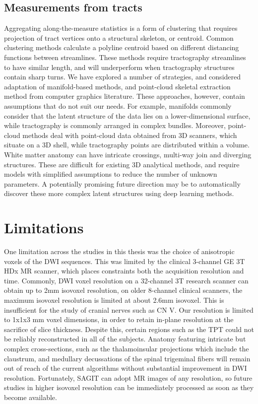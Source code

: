 \subsection{Measurements from tracts}
Aggregating along-the-measure statistics is a form of clustering that requires projection of tract vertices onto a structural skeleton, or centroid. Common clustering methods calculate a polyline centroid based on different distancing functions between streamlines. These methods require tractography streamlines to have similar length, and will underperform when tractography structures contain sharp turns. We have explored a number of strategies, and considered adaptation of manifold-based methods, and point-cloud skeletal extraction method from computer graphics literature. These approaches, however, contain assumptions that do not suit our needs. For example, manifolds commonly consider that the latent structure of the data lies on a lower-dimensional surface, while tractography is commonly arranged in complex bundles. Moreover, point-cloud methods deal with point-cloud data obtained from 3D scanners, which situate on a 3D shell, while tractography points are distributed within a volume. White matter anatomy can have intricate crossings, multi-way join and diverging structures. These are difficult for existing 3D analytical methods, and require models with simplified assumptions to reduce the number of unknown parameters. A potentially promising future direction may be to automatically discover these more complex latent structures using deep learning methods.

\section{Limitations}

One limitation across the studies in this thesis was the choice of anisotropic voxels of the DWI sequences. This was limited by the clinical 3-channel GE 3T HDx MR scanner, which places constraints both the acquisition resolution and time. Commonly, DWI voxel resolution on a 32-channel 3T research scanner can obtain up to 2mm isovoxel resolution, on older 8-channel clinical scanners, the maximum isovoxel resolution is limited at about 2.6mm isovoxel. This is insufficient for the study of cranial nerves such as CN V. Our resolution is limited to 1x1x3 mm voxel dimensions, in order to retain in-plane resolution at the sacrifice of slice thickness. Despite this, certain regions such as the TPT could not be reliably reconstructed in all of the subjects. Anatomy featuring intricate but complex cross-sections, such as the thalamoinsular projections which include the claustrum, and medullary decussations of the spinal trigeminal fibers will remain out of reach of the current algorithms without substantial improvement in DWI resolution. Fortunately, SAGIT can adopt MR images of any resolution, so future studies in higher isovoxel resolution can be immediately processed as soon as they become available. 


